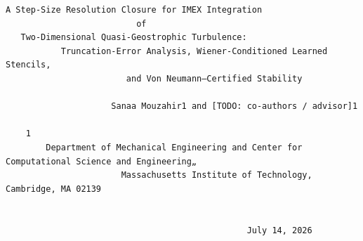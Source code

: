 \documentclass[letterpaper]{article}
\begin{document}
\begin{Verbatim}[fontsize=\fontsize{6.35}{7.15}\selectfont,breaklines=false]
 A Step-Size Resolution Closure for IMEX Integration
                          of
   Two-Dimensional Quasi-Geostrophic Turbulence:
           Truncation-Error Analysis, Wiener-Conditioned Learned Stencils,
                        and Von Neumann–Certified Stability

                     Sanaa Mouzahir1 and [TODO: co-authors / advisor]1

    1
        Department of Mechanical Engineering and Center for Computational Science and Engineering„
                       Massachusetts Institute of Technology, Cambridge, MA 02139


                                                July 14, 2026



\end{Verbatim}
\end{document}
